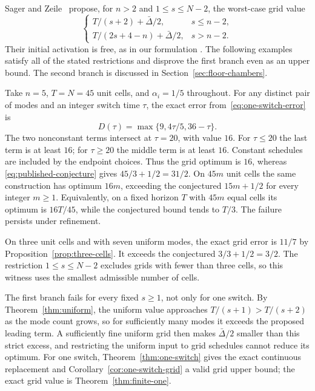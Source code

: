 Sager and Zeile~\cite[Conjecture~1, equation~(7.6)]{sager-zeile2021} propose,
for $n>2$ and $1\le s\le N-2$, the worst-case grid value
\begin{equation}\label{eq:published-conjecture}
 \begin{cases}
 T/(s+2)+\bar\Delta/2,&s\le n-2,\\
 T/(2s+4-n)+\bar\Delta/2,&s>n-2.
 \end{cases}
\end{equation}
Their initial activation is free, as in our formulation
\cite[Definition~10]{sager-zeile2021}. The following examples satisfy all
of the stated restrictions and disprove the first branch even as an upper
bound. The second branch is discussed in Section~\ref{sec:floor-chambers}.

\begin{example}\label{ex:five-mode-conjecture}
Take $n=5$, $T=N=45$ unit cells, and $\alpha_i=1/5$ throughout.
For any distinct pair of modes and an integer switch time $\tau$, the exact
error from~\eqref{eq:one-switch-error} is
\[
 D(\tau)=\max\{9,4\tau/5,36-\tau\}.
\]
The two nonconstant terms intersect at $\tau=20$, with value $16$.
For $\tau\le20$ the last term is at least $16$; for $\tau\ge20$ the
middle term is at least $16$. Constant schedules are included by the endpoint
choices. Thus the grid optimum is $16$, whereas
\eqref{eq:published-conjecture} gives $45/3+1/2=31/2$.
On $45m$ unit cells the same construction has optimum $16m$, exceeding the
conjectured $15m+1/2$ for every integer $m\ge1$. Equivalently, on a fixed
horizon $T$ with $45m$ equal cells its optimum is $16T/45$, while the
conjectured bound tends to $T/3$. The failure persists under refinement.
\end{example}

\begin{example}\label{ex:three-cell-conjecture}
On three unit cells and with seven uniform modes, the exact grid error is
$11/7$ by Proposition~\ref{prop:three-cells}. It exceeds the conjectured
$3/3+1/2=3/2$. The restriction $1\le s\le N-2$ excludes grids with fewer
than three cells, so this witness uses the smallest admissible number of
cells.
\end{example}

The first branch fails for every fixed $s\ge1$, not only for one switch.
By Theorem~\ref{thm:uniform}, the uniform value approaches
$T/(s+1)>T/(s+2)$ as the mode count grows, so for sufficiently many modes it
exceeds the proposed leading term. A sufficiently fine uniform grid then
makes $\bar\Delta/2$ smaller than this strict excess, and restricting the
uniform input to grid schedules cannot reduce its optimum. For one switch,
Theorem~\ref{thm:one-switch} gives the exact continuous replacement and
Corollary~\ref{cor:one-switch-grid} a valid grid upper bound; the exact
grid value is Theorem~\ref{thm:finite-one}.
